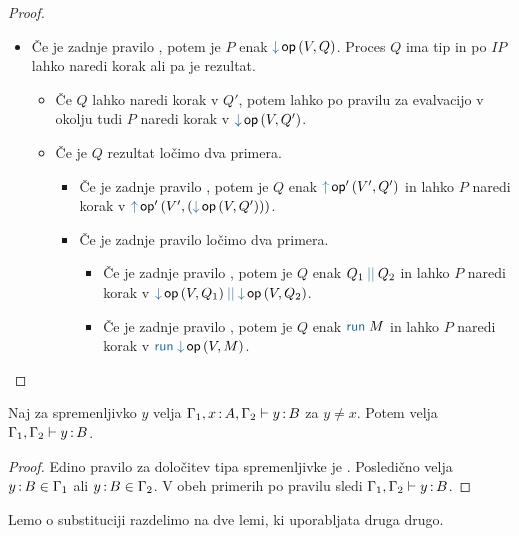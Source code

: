 \begin{proof}
\begin{itemize}
		\item Če je zadnje pravilo , potem je $P$ enak $\tmopin{op}{V}{Q}$. Proces $Q$ ima tip in po $IP$ lahko naredi korak ali pa je rezultat.
		\begin{itemize}
			\item Če $Q$ lahko naredi korak v $Q'$, potem lahko po pravilu za evalvacijo v okolju tudi $P$ naredi korak v $\tmopin{op}{V}{Q'}$.
			\item Če je $Q$ rezultat ločimo dva primera.
			\begin{itemize}
				
				\item Če je zadnje pravilo , potem je $Q$ enak $\tmopout{op'}{V'}{Q'}$ in lahko $P$ naredi korak v $\tmopout{op'}{V'}{(\tmopin{op}{V}{Q'})}$.
				
				\item Če je zadnje pravilo  ločimo dva primera.
				\begin{itemize}
					\item Če je zadnje pravilo , potem je $Q$ enak $\tmpar{Q_1}{Q_2}$ in lahko $P$ naredi korak v $\tmpar{\tmopin{op}{V}{Q_1}}{\tmopin{op}{V}{Q_2}}$.
					\item Če je zadnje pravilo , potem je $Q$ enak $\tmrun{M}$ in lahko $P$ naredi korak v $\tmrun{\tmopin{op}{V}{M}}$.
				\end{itemize}
				
			\end{itemize}
		\end{itemize}
		
	\end{itemize}
		
\end{proof}


\begin{lema}\label{lem:strengthening-gamma}
	Naj za spremenljivko $y$ velja $\Gamma_1, x \mathinner{:} A, \Gamma_2 \vdash y \mathinner{:} B$ za $y \neq x$. Potem velja $\Gamma_1, \Gamma_2 \vdash y \mathinner{:} B$.
\end{lema}

\begin{proof}
	Edino pravilo za določitev tipa spremenljivke je . Posledično velja $y \mathinner{:} B \in \Gamma_1$ ali $y \mathinner{:} B \in \Gamma_2$. V obeh primerih po pravilu  sledi $\Gamma_1, \Gamma_2 \vdash y \mathinner{:} B$.
\end{proof}

Lemo o substituciji razdelimo na dve lemi, ki uporabljata druga drugo.

